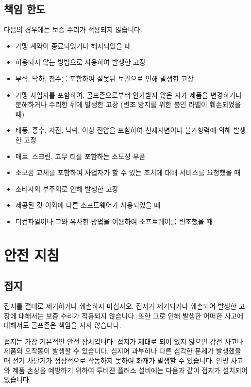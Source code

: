 \documentclass[10pt, openright, language=korean]{hzguide}
\begin{document}
\section{책임 한도}

다음의 경우에는 보증 수리가 적용되지 않습니다.

\begin{itemize}
\item 가맹 계약이 종료되었거나 해지되었을 때
\item 허용되지 않는 방법으로 사용하여 발생한 고장
\item 부식, 낙하, 침수를 포함하여 잘못된 보관으로 인해 발생한 고장
\item 가맹 사업자를 포함하여, 골프존으로부터 인가받지 않은 자가 제품을 변경하거나 분해하거나 수리한 뒤에 발생한 고장 (변조 방지를 위한 봉인 라벨이 훼손되었을 때)
\item 태풍, 홍수, 지진, 낙뢰, 이상 전압을 포함하여 천재지변이나 불가항력에 의해 발생한 고장
\item 매트, 스크린, 고무 티를 포함하는 소모성 부품
\item 소모품 교체를 포함하여 사업자가 할 수 있는 조치에 대해 서비스를 요청했을 때
\item 소비자의 부주의로 인해 발생한 고장
\item 제공된 것 이외에 다른 소프트웨어가 사용되었을 때
\item 디컴파일이나 그와 유사한 방법을 이용하여 소프트웨어를 변조했을 때
\end{itemize}

\chapter{안전 지침}

\section{접지}

\begin{Warning}
접지를 절대로 제거하거나 훼손하지 마십시오. 접지가 제거되거나 훼손되어 발생한 고장에 대해서는 보증 수리가 적용되지 않습니다. 또한 그로 인해 발생한 어떠한 사고에 대해서도 골프존은 책임을 지지 않습니다.
\end{Warning}

접지는 가장 기본적인 안전 장치입니다. 접지가 제대로 되어 있지 않으면 감전 사고나 제품의 오작동이 발생할 수 있습니다. 
심지어 과부하나 다른 심각한 문제가 발생했을 때 전기 차단기가 정상적으로 작동하지 못하여 화재가 발생할 수 있습니다.
인명 사고와 제품 손상을 예방하기 위하여 투비젼 플러스 설비에는 다음과 같이 접지가 설치되어 있습니다.
\end{document}
